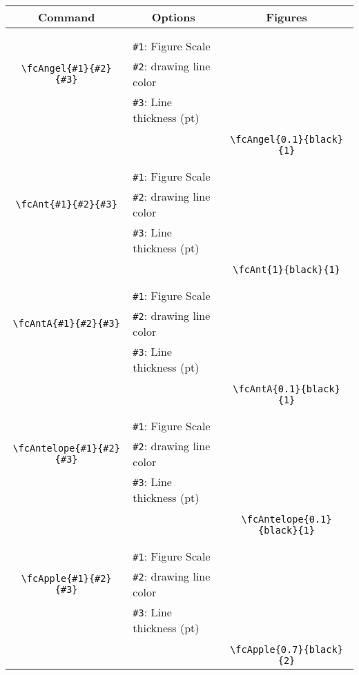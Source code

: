 \documentclass[x11names]{article}
\begin{document}
\begin{table}[H]\centering\begin{tabular}{|c|l|c|}\hline {\bf Command}& \multicolumn{1}{c|}{{\bf Options}} & {\bf Figures}\\  \hline	&&\multirow{5}{*}{\fcAngel{0.1}{black}{1}}\\	&&\\	&\verb|#1|: Figure Scale &\\	\verb|\fcAngel{#1}{#2}{#3}|&	\verb|#2|: drawing line color &\\	&\verb|#3|: Line thickness (pt) &\\ &&\\&&	\verb|\fcAngel{0.1}{black}{1}|\\\hline 	
	&&\multirow{5}{*}{\fcAnt{1}{black}{1}}\\	&&\\	&\verb|#1|: Figure Scale &\\	\verb|\fcAnt{#1}{#2}{#3}|&	\verb|#2|: drawing line color &\\	&\verb|#3|: Line thickness (pt) &\\ &&\\&&	\verb|\fcAnt{1}{black}{1}|\\\hline 	
	&&\multirow{5}{*}{\fcAntA{0.1}{black}{1}}\\	&&\\	&\verb|#1|: Figure Scale &\\	\verb|\fcAntA{#1}{#2}{#3}|&	\verb|#2|: drawing line color &\\	&\verb|#3|: Line thickness (pt) &\\ &&\\&&	\verb|\fcAntA{0.1}{black}{1}|\\\hline 	
	&&\multirow{5}{*}{\fcAntelope{0.1}{black}{1}}\\	&&\\	&\verb|#1|: Figure Scale &\\	\verb|\fcAntelope{#1}{#2}{#3}|&	\verb|#2|: drawing line color &\\	&\verb|#3|: Line thickness (pt) &\\ &&\\&&	\verb|\fcAntelope{0.1}{black}{1}|\\\hline 	
	&&\multirow{5}{*}{\fcApple{0.7}{black}{2}}\\	&&\\	&\verb|#1|: Figure Scale &\\	\verb|\fcApple{#1}{#2}{#3}|&	\verb|#2|: drawing line color &\\	&\verb|#3|: Line thickness (pt) &\\ &&\\&&	\verb|\fcApple{0.7}{black}{2}|\\\hline 	

\end{tabular}
\end{table}
\end{document}

